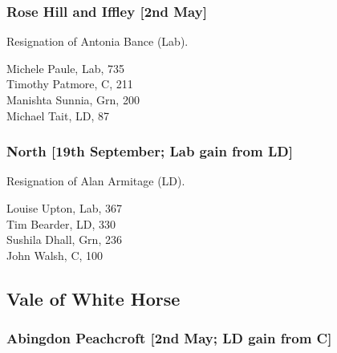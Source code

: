 \documentclass[a4paper,openany,10pt]{book}
\begin{document}
\subsubsection*{Rose Hill and Iffley \hspace*{\fill}\nolinebreak[1]%
\enspace\hspace*{\fill}
[2nd May]}


Resignation of Antonia Bance (Lab).



Michele Paule, Lab, 735\\
Timothy Patmore, C, 211\\
Manishta Sunnia, Grn, 200\\
Michael Tait, LD, 87\\


\subsubsection*{North \hspace*{\fill}\nolinebreak[1]%
\enspace\hspace*{\fill}
[19th September; Lab gain from LD]}


Resignation of Alan Armitage (LD).



Louise Upton, Lab, 367\\
Tim Bearder, LD, 330\\
Sushila Dhall, Grn, 236\\
John Walsh, C, 100\\


\subsection*{Vale of White Horse}

\subsubsection*{Abingdon Peachcroft \hspace*{\fill}\nolinebreak[1]%
\enspace\hspace*{\fill}
[2nd May; LD gain from C]}

\end{document}
